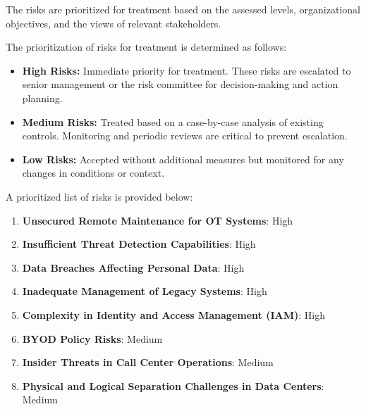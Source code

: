 The risks are prioritized for treatment based on the assessed levels, organizational objectives, and the views of relevant stakeholders.

The prioritization of risks for treatment is determined as follows:
\begin{itemize}
    \item \textbf{High Risks:} Immediate priority for treatment. These risks are escalated to senior management or the risk committee for decision-making and action planning.
    \item \textbf{Medium Risks:} Treated based on a case-by-case analysis of existing controls. Monitoring and periodic reviews are critical to prevent escalation.
    \item \textbf{Low Risks:} Accepted without additional measures but monitored for any changes in conditions or context.
\end{itemize}

A prioritized list of risks is provided below:
\begin{enumerate}
    \item \textbf{Unsecured Remote Maintenance for OT Systems}: High
    \item \textbf{Insufficient Threat Detection Capabilities}: High
    \item \textbf{Data Breaches Affecting Personal Data}: High
    \item \textbf{Inadequate Management of Legacy Systems}: High
    \item \textbf{Complexity in Identity and Access Management (IAM)}: High
    \item \textbf{BYOD Policy Risks}: Medium
    \item \textbf{Insider Threats in Call Center Operations}: Medium
    \item \textbf{Physical and Logical Separation Challenges in Data Centers}: Medium
\end{enumerate}